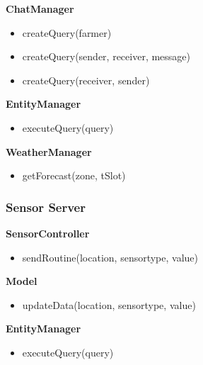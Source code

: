 \textbf{ChatManager}
\begin{itemize}
    \item createQuery(farmer)
    \item createQuery(sender, receiver, message)
    \item createQuery(receiver, sender)
\end{itemize}
\textbf{EntityManager}
\begin{itemize}
    \item executeQuery(query)
\end{itemize}
\textbf{WeatherManager}
\begin{itemize}
    \item getForecast(zone, tSlot)
\end{itemize}

\subsubsection{Sensor Server}
\textbf{SensorController}
\begin{itemize}
    \item sendRoutine(location, sensortype, value)
\end{itemize}
\textbf{Model}
\begin{itemize}
    \item updateData(location, sensortype, value)
\end{itemize}
\textbf{EntityManager}
\begin{itemize}
    \item executeQuery(query)
\end{itemize}
\newpage

